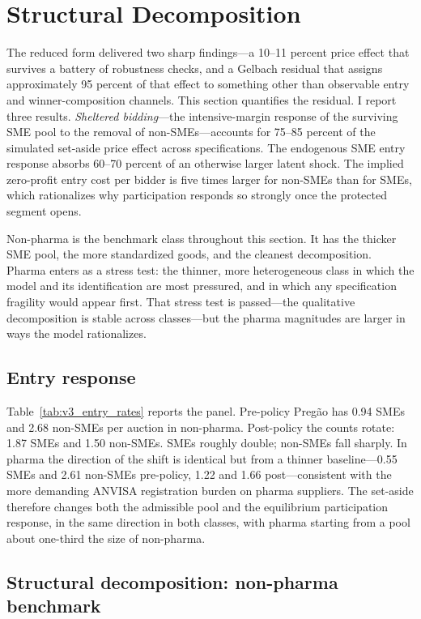 \section{Structural Decomposition}\label{sec:results}

The reduced form delivered two sharp findings---a 10--11 percent price effect that survives a battery of robustness checks, and a Gelbach residual that assigns approximately 95 percent of that effect to something other than observable entry and winner-composition channels. This section quantifies the residual. I report three results. \emph{Sheltered bidding}---the intensive-margin response of the surviving SME pool to the removal of non-SMEs---accounts for 75--85 percent of the simulated set-aside price effect across specifications. The endogenous SME entry response absorbs 60--70 percent of an otherwise larger latent shock. The implied zero-profit entry cost per bidder is five times larger for non-SMEs than for SMEs, which rationalizes why participation responds so strongly once the protected segment opens.

Non-pharma is the benchmark class throughout this section. It has the thicker SME pool, the more standardized goods, and the cleanest decomposition. Pharma enters as a stress test: the thinner, more heterogeneous class in which the model and its identification are most pressured, and in which any specification fragility would appear first. That stress test is passed---the qualitative decomposition is stable across classes---but the pharma magnitudes are larger in ways the model rationalizes.

\subsection{Entry response}

Table~\ref{tab:v3_entry_rates} reports the panel. Pre-policy Preg\~ao has 0.94 SMEs and 2.68 non-SMEs per auction in non-pharma. Post-policy the counts rotate: 1.87 SMEs and 1.50 non-SMEs. SMEs roughly double; non-SMEs fall sharply. In pharma the direction of the shift is identical but from a thinner baseline---0.55 SMEs and 2.61 non-SMEs pre-policy, 1.22 and 1.66 post---consistent with the more demanding ANVISA registration burden on pharma suppliers. The set-aside therefore changes both the admissible pool and the equilibrium participation response, in the same direction in both classes, with pharma starting from a pool about one-third the size of non-pharma.

\subsection{Structural decomposition: non-pharma benchmark}

